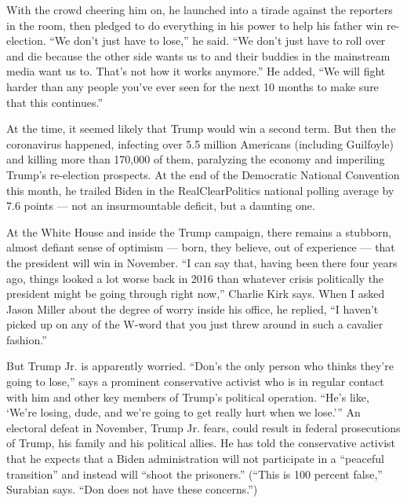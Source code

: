 With the crowd cheering him on, he launched into a tirade against the
reporters in the room, then pledged to do everything in his power to
help his father win re-election. ``We don't just have to lose,'' he
said. ``We don't just have to roll over and die because the other side
wants us to and their buddies in the mainstream media want us to. That's
not how it works anymore.'' He added, ``We will fight harder than any
people you've ever seen for the next 10 months to make sure that this
continues.''

At the time, it seemed likely that Trump would win a second term. But
then the coronavirus happened, infecting over 5.5 million Americans
(including Guilfoyle) and killing more than 170,000 of them, paralyzing
the economy and imperiling Trump's re-election prospects. At the end of
the Democratic National Convention this month, he trailed Biden in the
RealClearPolitics national polling average by 7.6 points --- not an
insurmountable deficit, but a daunting one.

At the White House and inside the Trump campaign, there remains a
stubborn, almost defiant sense of optimism --- born, they believe, out
of experience --- that the president will win in November. ``I can say
that, having been there four years ago, things looked a lot worse back
in 2016 than whatever crisis politically the president might be going
through right now,'' Charlie Kirk says. When I asked Jason Miller about
the degree of worry inside his office, he replied, ``I haven't picked up
on any of the W-word that you just threw around in such a cavalier
fashion.''

But Trump Jr. is apparently worried. ``Don's the only person who thinks
they're going to lose,'' says a prominent conservative activist who is
in regular contact with him and other key members of Trump's political
operation. ``He's like, `We're losing, dude, and we're going to get
really hurt when we lose.''' An electoral defeat in November, Trump Jr.
fears, could result in federal prosecutions of Trump, his family and his
political allies. He has told the conservative activist that he expects
that a Biden administration will not participate in a ``peaceful
transition'' and instead will ``shoot the prisoners.'' (``This is 100
percent false,'' Surabian says. ``Don does not have these concerns.'')

